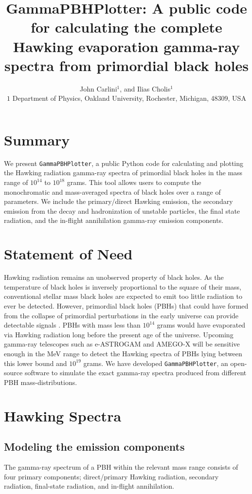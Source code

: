 \documentclass[11pt]{article}
\title{GammaPBHPlotter: A public code for calculating the complete Hawking evaporation gamma-ray spectra from primordial black holes}
\author{John Carlini$^{1}$, and Ilias Cholis$^{1}$\\[0.5em]
\small $1$ Department of Physics, Oakland University, Rochester, Michigan, 48309, USA
\\
\small %
}
\date{} %
\renewcommand{\cite}{\citep}
\begin{document}
\maketitle

\section{Summary}
We present \texttt{GammaPBHPlotter}, a public Python code for calculating and plotting the Hawking radiation gamma-ray spectra of primordial black holes in the mass range of $10^{14}$ to $10^{18}$ grams. This tool allows users to compute the monochromatic and mass-averaged spectra of black holes over a range of parameters. We include the primary/direct Hawking emission, the secondary emission from the decay and hadronization of unstable particles, the final state radiation, and the in-flight annihilation gamma-ray emission components.

\section{Statement of Need}

Hawking radiation \cite{1974Natur.248...30H} remains an unobserved property of black holes.
As the temperature of black holes is inversely proportional to the square of their mass, conventional stellar mass black holes  are expected to emit too little radiation to ever be detected. However, primordial black holes (PBHs) that could have formed from the collapse of primordial perturbations in the early universe can provide detectable signals \cite{Carr:2016drx}. PBHs with mass less than $10^{14}$ grams would have evaporated via Hawking radiation long before the present age of the universe. Upcoming gamma-ray telescopes such as e-ASTROGAM \cite{e-ASTROGAM:2017pxr} and AMEGO-X \cite{Caputo:2022xpx} will be sensitive enough in the MeV range to detect the Hawking spectra of PBHs lying between this lower bound and $10^{19}$ grams. 
We have developed \texttt{GammaPBHPlotter}, an open-source software to simulate the exact gamma-ray spectra produced from different PBH mass-distributions. 

\section{Hawking Spectra}
\subsection{Modeling the emission components}
The gamma-ray spectrum of a PBH within the relevant mass range consists of four primary components; direct/primary Hawking radiation, secondary radiation, final-state radiation, and in-flight annihilation.
\end{document}
